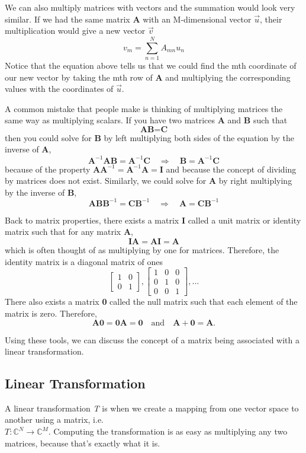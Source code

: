 \documentclass{article}
\newcommand{\be}{\begin{equation}}
\newcommand{\ee}{\end{equation}}
\begin{document}
We can also multiply matrices with vectors and the summation would look very similar.
If we had the same matrix \textbf{A} with an M-dimensional vector $\vec{u}$, their multiplication would give a new vector $\vec{v}$
\be
  v_{m} = \sum_{n=1}^{N} A_{mn} u_{n}
\ee
Notice that the equation above tells us that we could find the mth coordinate of our new vector by taking the mth row of \textbf{A} and multiplying the corresponding values with the coordinates of $\vec{u}$.

A common mistake that people make is thinking of multiplying matrices the same way as multiplying scalars.
If you have two matrices \textbf{A} and \textbf{B} such that
\be
  \textbf{A} \textbf{B} = \textbf{C}
\ee
then you could solve for \textbf{B} by left multiplying both sides of the equation by the inverse of \textbf{A},
\be
  \textbf{A}^{-1} \textbf{A} \textbf{B} = \textbf{A}^{-1} \textbf{C} \quad \Rightarrow \quad \textbf{B} = \textbf{A}^{-1} \textbf{C}
\ee
because of the property $\textbf{A} \textbf{A}^{-1} = \textbf{A}^{-1} \textbf{A} = \textbf{I}$ and because the concept of dividing by matrices does not exist.
Similarly, we could solve for \textbf{A} by right multiplying by the inverse of \textbf{B},
\be
  \textbf{A} \textbf{B} \textbf{B}^{-1} = \textbf{C} \textbf{B}^{-1} \quad \Rightarrow \quad \textbf{A} = \textbf{C} \textbf{B}^{-1}
\ee

Back to matrix properties, there exists a matrix \textbf{I} called a unit matrix or identity matrix such that for any matrix \textbf{A},
\be
  \textbf{I} \textbf{A} = \textbf{A} \textbf{I} = \textbf{A}
\ee
which is often thought of as multiplying by one for matrices.
Therefore, the identity matrix is a diagonal matrix of ones
\be
\begin{bmatrix}
   1 & 0\\
   0 & 1
\end{bmatrix}
,
\begin{bmatrix}
   1 & 0 & 0\\
   0 & 1 & 0\\
   0 & 0 & 1
\end{bmatrix}
, \dots
\ee
There also exists a matrix \textbf{0} called the null matrix such that each element of the matrix is zero.
Therefore,
\be
  \textbf{A} \textbf{0} = \textbf{0} \textbf{A} = \textbf{0} \quad \text{and} \quad \textbf{A} + \textbf{0} = \textbf{A} .
\ee

Using these tools, we can discuss the concept of a matrix being associated with a linear transformation.

\subsection*{Linear Transformation}
A linear transformation \textit{T} is when we create a mapping from one vector space to another using a matrix, i.e.\\
$\textit{T}: \mathbb{C}^N \rightarrow \mathbb{C}^M$.
Computing the transformation is as easy as multiplying any two matrices, because that's exactly what it is.
\end{document}
